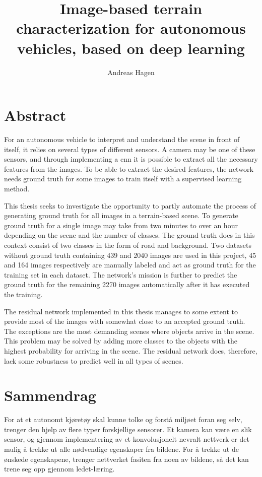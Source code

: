 \documentclass[USenglish]{ifimaster}  %
\title{Image-based terrain characterization for autonomous vehicles, based on deep learning}        %
\author{Andreas Hagen}                      %
\begin{document}
\duoforside[dept={Department of Physics},   %
  program={Electronics and Computer Technology Program option: Cybernetics},  %
  short]                                        %

\frontmatter{}
\chapter*{Abstract}                   %
For an autonomous vehicle to interpret and understand the scene in front of itself, it relies on several types of different sensors. A camera may be one of these sensors, and through implementing a \acf{cnn} it is possible to extract all the necessary features from the images. To be able to extract the desired features, the network needs ground truth for some images to train itself with a supervised learning method.

This thesis seeks to investigate the opportunity to partly automate the process of generating ground truth for all images in a terrain-based scene. To generate ground truth for a single image may take from two minutes to over an hour depending on the scene and the number of classes. The ground truth does in this context consist of two classes in the form of road and background. Two datasets without ground truth containing 439 and 2040 images are used in this project, 45 and 164 images respectively are manually labeled and act as ground truth for the training set in each dataset. The network's mission is further to predict the ground truth for the remaining 2270 images automatically after it has executed the training.

The residual network implemented in this thesis manages to some extent to provide most of the images with somewhat close to an accepted ground truth. The exceptions are the most demanding scenes where objects arrive in the scene. This problem may be solved by adding more classes to the objects with the highest probability for arriving in the scene. The residual network does, therefore, lack some robustness to predict well in all types of scenes. 

\chapter*{Sammendrag}
For at et autonomt kjøretøy skal kunne tolke og forstå miljøet foran seg selv, trenger den hjelp av flere typer forskjellige sensorer. Et kamera kan være en slik sensor, og gjennom implementering av et konvolusjonelt nevralt nettverk er det mulig å trekke ut alle nødvendige egenskaper fra bildene. For å trekke ut de ønskede egenskapene, trenger nettverket fasiten fra noen av bildene, så det kan trene seg opp gjennom ledet-læring.
\end{document}
